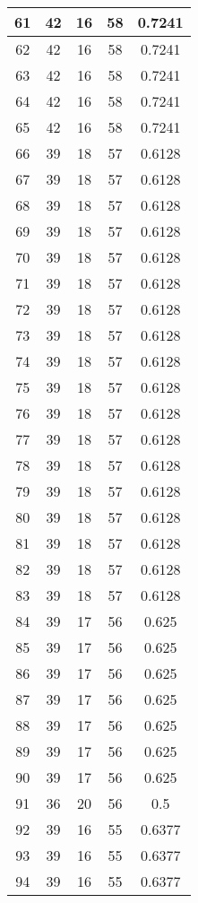 \documentclass[letterpaper, 12pt]{article}
\begin{document}
\begin{longtable}{|c|c|c|c|c|}
61 & 42 & 16 & 58 & 0.7241 \\
\hline
62 & 42 & 16 & 58 & 0.7241 \\
\hline
63 & 42 & 16 & 58 & 0.7241 \\
\hline
64 & 42 & 16 & 58 & 0.7241 \\
\hline
65 & 42 & 16 & 58 & 0.7241 \\
\hline
66 & 39 & 18 & 57 & 0.6128 \\
\hline
67 & 39 & 18 & 57 & 0.6128 \\
\hline
68 & 39 & 18 & 57 & 0.6128 \\
\hline
69 & 39 & 18 & 57 & 0.6128 \\
\hline
70 & 39 & 18 & 57 & 0.6128 \\
\hline
71 & 39 & 18 & 57 & 0.6128 \\
\hline
72 & 39 & 18 & 57 & 0.6128 \\
\hline
73 & 39 & 18 & 57 & 0.6128 \\
\hline
74 & 39 & 18 & 57 & 0.6128 \\
\hline
75 & 39 & 18 & 57 & 0.6128 \\
\hline
76 & 39 & 18 & 57 & 0.6128 \\
\hline
77 & 39 & 18 & 57 & 0.6128 \\
\hline
78 & 39 & 18 & 57 & 0.6128 \\
\hline
79 & 39 & 18 & 57 & 0.6128 \\
\hline
80 & 39 & 18 & 57 & 0.6128 \\
\hline
81 & 39 & 18 & 57 & 0.6128 \\
\hline
82 & 39 & 18 & 57 & 0.6128 \\
\hline
83 & 39 & 18 & 57 & 0.6128 \\
\hline
84 & 39 & 17 & 56 & 0.625 \\
\hline
85 & 39 & 17 & 56 & 0.625 \\
\hline
86 & 39 & 17 & 56 & 0.625 \\
\hline
87 & 39 & 17 & 56 & 0.625 \\
\hline
88 & 39 & 17 & 56 & 0.625 \\
\hline
89 & 39 & 17 & 56 & 0.625 \\
\hline
90 & 39 & 17 & 56 & 0.625 \\
\hline
91 & 36 & 20 & 56 & 0.5 \\
\hline
92 & 39 & 16 & 55 & 0.6377 \\
\hline
93 & 39 & 16 & 55 & 0.6377 \\
\hline
94 & 39 & 16 & 55 & 0.6377 \\

\end{longtable}
\end{document}
